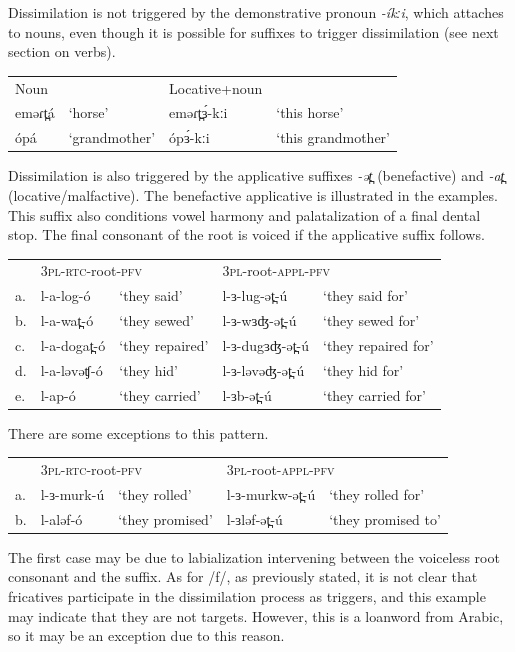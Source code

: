 Dissimilation is not triggered by the demonstrative pronoun \textit{-íkːi}, which attaches to nouns, even though it is possible for suffixes to trigger dissimilation (see next section on verbs).

\ea
\begin{tabular}[t]{llll}
	Noun	&&		Locative+noun\\
	eməɾt̪á	&	‘horse’	&	eməɾt̪ɜ́-kːi	&	‘this horse’\\
	ópá		&	‘grandmother’&	ópɜ́-kːi	&	‘this grandmother’\\
\end{tabular}
\z

Dissimilation is also triggered by the applicative suffixes \textit{-ət̪} (benefactive) and \textit{-at̪} (locative/malfactive). The benefactive applicative is illustrated in the examples. This suffix also conditions vowel harmony and palatalization of a final dental stop. The final consonant of the root is voiced if the applicative suffix follows. 

\ea
\begin{tabular}[t]{lllll}
&	\multicolumn{2}{l}{3\textsc{pl}-\textsc{rtc}-root-\textsc{pfv}} & \multicolumn{2}{l}{3\textsc{pl}-root-\textsc{appl}-\textsc{pfv}}\\
	a.& l-a-log-ó	&‘they said’		&l-ɜ-lug-ət̪-ú	&‘they said for’\\
	b.&	l-a-wat̪-ó	&‘they sewed’	&l-ɜ-wɜʤ-ət̪-ú	&‘they sewed for’\\
	c.&	l-a-dogat̪-ó	&‘they repaired’	&l-ɜ-dugɜʤ-ət̪-ú	&‘they repaired for’\\
	d.&	l-a-ləvəʧ-ó	&‘they hid’		&l-ɜ-ləvəʤ-ət̪-ú	&‘they hid for’\\
	e.&	l-ap-ó		&‘they carried’	&l-ɜb-ət̪-ú		&‘they carried for’\\
\end{tabular}
\z

There are some exceptions to this pattern.

\ea
\begin{tabular}[t]{lllll}
&	\multicolumn{2}{l}{3\textsc{pl}-\textsc{rtc}-root-\textsc{pfv}} & \multicolumn{2}{l}{3\textsc{pl}-root-\textsc{appl}-\textsc{pfv}}\\
	a.&	l-ɜ-murk-ú 	&‘they rolled’	&l-ɜ-murkw-ət̪-ú	   &‘they rolled for’\\
	b.&	l-aləf-ó  	&‘they promised’	&l-ɜləf-ət̪-ú 	   &‘they promised to’\\
\end{tabular}
\z

The first case may be due to labialization intervening between the voiceless root consonant and the suffix. As for /f/, as previously stated, it is not clear that fricatives participate in the dissimilation process as triggers, and this example may indicate that they are not targets. However, this is a loanword from Arabic, so it may be an exception due to this reason. 

